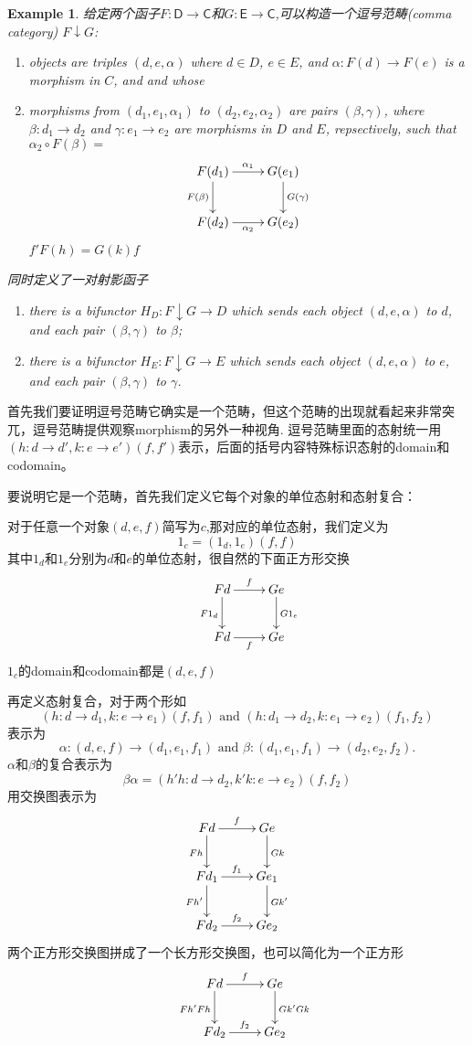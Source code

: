 \documentclass{article}
\newtheorem{example}[theorem]{Example}
\newcommand{\sC}{\mathsf{C}}
\newcommand{\sD}{\mathsf{D}}
\newcommand{\sE}{\mathsf{E}}
\newcommand{\al}{\alpha}
\newcommand{\be}{\beta}
\newcommand{\AND}{\text{ and }}
\newcommand*{\xfunc}[4]{{#2}\colon{#3}{#1}{#4}}
\newcommand*{\func}[3]{\xfunc{\to}{#1}{#2}{#3}}
\newcommand*{\qty}[1]{\left({#1}\right)}
\begin{document}
\begin{example}
\rm 给定两个函子$\func{F}{\sD}{\sC}$和$\func{G}{\sE}{\sC}$,可以构造一个逗号范畴(comma category) $F \downarrow G$:
	\begin{enumerate}
		\item objects are triples $(d,e,\alpha)$ where $d \in D$, $e \in E$, and $\alpha: F(d) \to F(e)$ is a morphism in $C$, and and whose
		\item morphisms from $(d_1,e_1,\alpha_1)$ to $(d_2,e_2,\alpha_2)$ are pairs $(\beta,\gamma)$, where $\beta:d_1 \to d_2$ and $\gamma: e_1 \to e_2$ are morphisms in $D$ and $E$, repsectively, such that $\alpha_2 \circ F(\beta) = $
		\[\xymatrix{
					F(d_1) \ar[d]_{F(\beta)} \ar[r]^{\alpha_1} & G(e_1)\ar[d]^{G(\gamma)}  \\
			F(d_2)\ar[r]_{\alpha_2} &G(e_2)}\]
			$f'F(h) = G(k)f$
	\end{enumerate}
	同时定义了一对射影函子
	\begin{enumerate}
		\item there is a bifunctor $H_D:F\downarrow G \to D$ which sends each object $(d,e,\alpha)$ to $d$, and each pair $(\beta,\gamma)$ to $\beta$;
		\item there is a bifunctor $H_E:F\downarrow G \to E$ which sends each object $(d,e,\alpha)$ to $e$, and each pair $(\beta,\gamma)$ to $\gamma$.
	\end{enumerate}
\end{example}

首先我们要证明逗号范畴它确实是一个范畴，但这个范畴的出现就看起来非常突兀，逗号范畴提供观察morphism的另外一种视角. 逗号范畴里面的态射统一用$\qty{\func{h}{d}{d'},\func{k}{e}{e'}} \qty{f,f'}$表示，后面的括号内容特殊标识态射的domain和codomain。

要说明它是一个范畴，首先我们定义它每个对象的单位态射和态射复合：

对于任意一个对象$\qty{d,e,f}$简写为$c$,那对应的单位态射，我们定义为\[ 1_c  = \qty{1_{d},1_{e}}\qty{f,f}\]其中$1_d$和$1_e$分别为$d$和$e$的单位态射，很自然的下面正方形交换
\[\xymatrix{ &Fd \ar[d]_{F1_{d}} \ar[r]^{f} & Ge\ar[d]^{G1_{e}}
						 \\  & Fd\ar[r]_{f} &Ge   } \]
$1_c$的domain和codomain都是$\qty{d,e,f}$

再定义态射复合，对于两个形如
$$\qty{\func{h}{d}{d_1},\func{k}{e}{e_1}} \qty{f,f_1} \AND
	\qty{\func{h}{d_1}{d_2},\func{k}{e_1}{e_2}} \qty{f_1,f_2}$$ 
表示为
$$\func{\al}{(d,e,f)}{(d_1,e_1,f_1)} \AND
	\func{\be}{(d_1,e_1,f_1)}{(d_2,e_2,f_2)}.$$ $\al$和$\be$的复合表示为
\[\be  \al=\qty{\func{h'  h}{d}{d_{2}},\func{k'  k}{e}{e_{2}}}\qty{f,f_2}\]用交换图表示为\[\xymatrix{ Fd \ar[d]_{Fh} \ar[r]^{f} & Ge\ar[d]^{Gk}  \\
			Fd_{1} \ar[d]_{Fh'}\ar[r]^{f_{1}}& Ge_{1} \ar[d]^{Gk'} \\
	Fd_{2} \ar[r]^{f_{2}} &Ge_2 } \]两个正方形交换图拼成了一个长方形交换图，也可以简化为一个正方形\[\xymatrix{ &Fd \ar[d]_{Fh'  Fh}\ar[r]^{f} & Ge\ar[d]^{Gk' Gk}
			 \\  & Fd_2\ar[r]^{f_2} &Ge_2 }\]
			 
\end{document}

